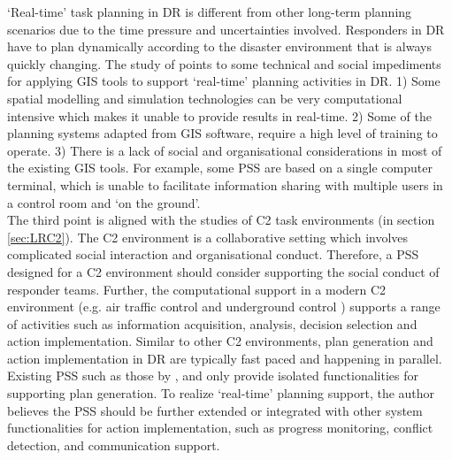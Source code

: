 `Real-time' task planning in \ac{DR} is different from other long-term planning scenarios due to the time pressure and uncertainties involved.  Responders in \ac{DR} have to plan dynamically according to the disaster environment that is always quickly changing. The study of \cite{Zerger2003} points to some technical and social impediments for applying \ac{GIS} tools to support `real-time' planning activities in \ac{DR}. 1) Some spatial modelling and simulation technologies \citep{Eglese1994} can be very computational intensive which makes it unable to provide results in real-time. 2) Some of the planning systems adapted from \ac{GIS} software, require a high level of training to operate. 3) There is a lack of social and organisational considerations in most of the existing \ac{GIS} tools. For example, some \ac{PSS} are based on a single computer terminal, which is unable to facilitate information sharing with multiple users in a control room and `on the ground'. \\

The third point is aligned with the studies of \ac{C2} task environments (in section \ref{sec:LRC2}). The \ac{C2} environment is a collaborative setting which involves complicated social interaction and organisational conduct. Therefore, a \ac{PSS} designed for a \ac{C2} environment should consider supporting the social conduct of responder teams. Further, the computational support in a modern \ac{C2} environment (e.g. air traffic control \citep{Mercer2014} and underground control \citep{Sharples2011}) supports a range of activities such as information acquisition, analysis, decision selection and action implementation. Similar to other \ac{C2} environments, plan generation and action implementation in DR are typically fast paced and happening in parallel. Existing \ac{PSS} such as those by \citep{IntergraphCorporation2000}, and \citep{Eglese1994} only provide isolated functionalities for supporting plan generation. To realize `real-time' planning support, the author believes the \ac{PSS} should be further extended or integrated with other system functionalities for action implementation, such as progress monitoring, conflict detection, and communication support.\\


